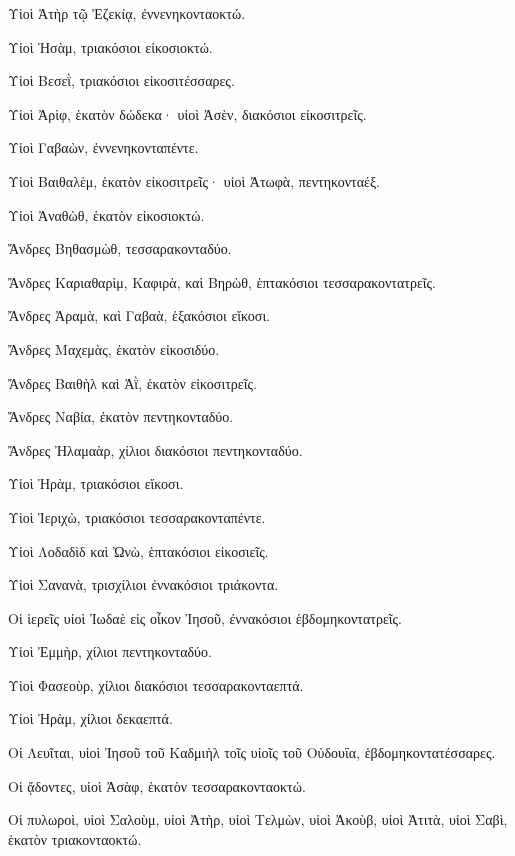 {\par }{\PP {}Υἱοὶ Ἀτὴρ τῷ Ἐζεκίᾳ, ἐννενηκονταοκτώ.
\par }{\PP {}Υἱοὶ Ἠσὰμ, τριακόσιοι εἰκοσιοκτώ.
\par }{\PP {}Υἱοὶ Βεσεῒ, τριακόσιοι εἰκοσιτέσσαρες.
\par }{\PP {}Υἱοὶ Ἀρὶφ, ἑκατὸν δώδεκα· υἱοὶ Ἀσὲν, διακόσιοι εἰκοσιτρεῖς.
\par }{\PP {}Υἱοὶ Γαβαὼν, ἐννενηκονταπέντε.
\par }{\PP {}Υἱοὶ Βαιθαλὲμ, ἑκατὸν εἰκοσιτρεῖς· υἱοὶ Ἀτωφὰ, πεντηκονταέξ.
\par }{\PP {}Υἱοὶ Ἀναθὼθ, ἑκατὸν εἰκοσιοκτώ.
\par }{\PP {}Ἄνδρες Βηθασμὼθ, τεσσαρακονταδύο.
\par }{\PP {}Ἄνδρες Καριαθαρὶμ, Καφιρὰ, καὶ Βηρὼθ, ἑπτακόσιοι τεσσαρακοντατρεῖς.
\par }{\PP {}Ἄνδρες Ἀραμὰ, καὶ Γαβαὰ, ἑξακόσιοι εἴκοσι.
\par }{\PP {}Ἄνδρες Μαχεμὰς, ἑκατὸν εἰκοσιδύο.
\par }{\PP {}Ἄνδρες Βαιθὴλ καὶ Ἀῒ, ἑκατὸν εἰκοσιτρεῖς.
\par }{\PP {}Ἄνδρες Ναβία, ἐκατὸν πεντηκονταδύο.
\par }{\PP {}Ἄνδρες Ἠλαμαὰρ, χίλιοι διακόσιοι πεντηκονταδύο.
\par }{\PP {}Υἱοὶ Ἠρὰμ, τριακόσιοι εἴκοσι.
\par }{\PP {}Υἱοὶ Ἱεριχὼ, τριακόσιοι τεσσαρακονταπέντε.
\par }{\PP {}Υἱοὶ Λοδαδὶδ καὶ Ὠνὼ, ἑπτακόσιοι εἰκοσιεῖς.
\par }{\PP {}Υἱοὶ Σανανὰ, τρισχίλιοι ἐννακόσιοι τριάκοντα.
\par }{\PP {}Οἱ ἱερεῖς υἱοὶ Ἰωδαὲ εἰς οἶκον Ἰησοῦ, ἐννακόσιοι ἑβδομηκοντατρεῖς.
\par }{\PP {}Υἱοὶ Ἐμμὴρ, χίλιοι πεντηκονταδύο.
\par }{\PP {}Υἱοὶ Φασεοὺρ, χίλιοι διακόσιοι τεσσαρακονταεπτά.
\par }{\PP {}Υἱοὶ Ἠρὰμ, χίλιοι δεκαεπτά.
\par }{\PP {}Οἱ Λευῖται, υἱοὶ Ἰησοῦ τοῦ Καδμιὴλ τοῖς υἱοῖς τοῦ Οὐδουΐα, ἑβδομηκοντατέσσαρες.
\par }{\PP {}Οἱ ᾄδοντες, υἱοὶ Ἀσὰφ, ἑκατὸν τεσσαρακονταοκτώ.
\par }{\PP {}Οἱ πυλωροὶ, υἱοὶ Σαλοὺμ, υἱοὶ Ἀτὴρ, υἱοὶ Τελμὼν, υἱοὶ Ἀκοὺβ, υἱοὶ Ἀτιτὰ, υἱοὶ Σαβὶ, ἑκατὸν τριακονταοκτώ.
}

